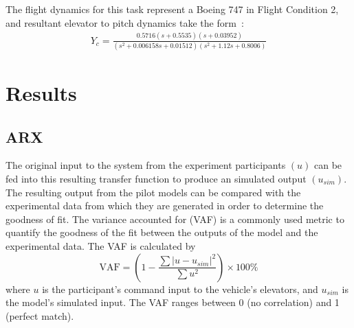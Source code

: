 The flight dynamics for this task represent a Boeing 747 in Flight Condition 2, and resultant elevator to pitch dynamics take the form~\citep{heffley1972aircraft}:
\begin{align}
    Y_c = \frac{0.5716 (s+0.5535) (s+0.03952)}{(s^2 + 0.006158s + 0.01512) (s^2 + 1.12s + 0.8006)}
\end{align}

\section{Results}

\subsection{ARX}
The original input to the system from the experiment participants $(u)$ can be fed into this resulting transfer function to produce an simulated output $(u_{sim})$.
The resulting output from the pilot models can be compared with the experimental data from which they are generated in order to determine the goodness of fit.
The variance accounted for (VAF) is a commonly used metric to quantify the goodness of the fit between the outputs of the model and the experimental data.
The VAF is calculated by
\begin{equation}
    \mbox{VAF} = \left( 1 - \dfrac{\sum{|u - u_{sim}|^2}} {\sum{u^2}} \right) \times \mbox{100\%}
\end{equation}
where $u$ is the participant's command input to the vehicle's elevators, and $u_{sim}$ is the model's simulated input.
The VAF ranges between 0 (no correlation) and 1 (perfect match).

